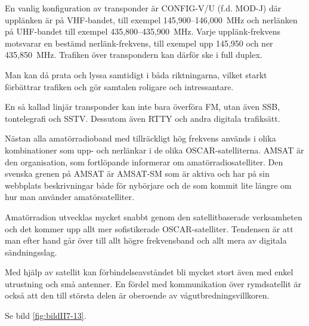 En vanlig konfiguration av transponder är CONFIG-V/U (f.d. MOD-J) där
upplänken är på VHF-bandet, till exempel 145,900--146,000~MHz och nerlänken på
UHF-bandet till exempel 435,800--435,900~MHz.
Varje upplänk-frekvens motsvarar en bestämd nerlänk-frekvens, till exempel upp
145,950 och ner 435,850~MHz.
Trafiken över transpondern kan därför ske i full duplex.

Man kan då prata och lyssa samtidigt i båda riktningarna, vilket
starkt förbättrar trafiken och gör samtalen roligare och intressantare.

En så kallad linjär transponder kan inte bara överföra FM, utan även SSB,
tontelegrafi och SSTV.
Dessutom även RTTY och andra digitala trafiksätt.

Nästan alla amatörradioband med tillräckligt hög frekvens används i
olika kombinationer som upp- och nerlänkar i de olika OSCAR-satelliterna.
AMSAT är den organisation, som fortlöpande informerar om amatörradiosatelliter.
Den svenska grenen på AMSAT är AMSAT-SM som är aktiva och har på sin webbplats
beskrivningar både för nybörjare och de som kommit lite längre om hur man
använder amatörsatelliter.


Amatörradion utvecklas mycket snabbt genom den satellitbaserade
verksamheten och det kommer upp allt mer sofistikerade OSCAR-satelliter.
Tendensen är att man efter hand går över till allt
högre frekvensband och allt mera av digitala sändningsslag.

Med hjälp av satellit kan förbindelseavståndet bli mycket stort även
med enkel utrustning och små antenner.
En fördel med kommunikation över rymdsatellit är också att den till största
delen är oberoende av vågutbredningsvillkoren.

Se bild \ref{fig:bildII7-13}.
